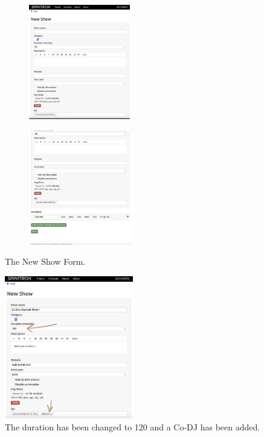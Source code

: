 \documentclass[12pt]{article}
\begin{document}
\begin{figure}[h]
 
    \begin{subfigure}{0.5\textwidth}
    \includegraphics[width=0.9\linewidth, height=5cm]{images/New_show1.png} 
    \label{fig:NS1}
    \end{subfigure}
    \begin{subfigure}{0.5\textwidth}
    \includegraphics[width=0.9\linewidth, height=5cm]{images/New_show2.png}
    \label{fig:NS2}
    \end{subfigure}
 
\caption{The New Show Form.}
\label{fig8}
\end{figure}

\clearpage

\begin{figure}
    \includegraphics[width=0.5\textwidth]{images/New_show3.png}
    \caption{The duration has been changed to 120 and a Co-DJ has been added.}
    \label{fig9}
\end{figure}
\end{document}
